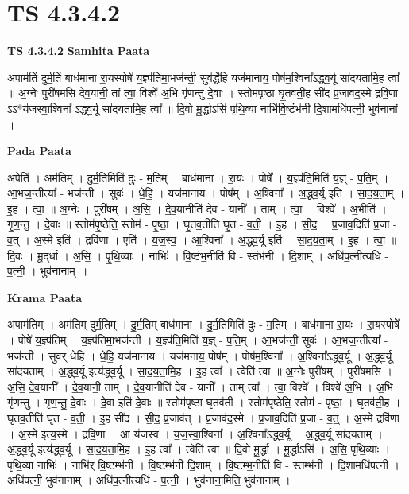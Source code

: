 \documentclass[17pt]{extarticle}
\begin{document}
\section{ TS 4.3.4.2 }

\textbf{TS 4.3.4.2 } \newline
\textbf{Samhita Paata} \newline

अपाम॑तिं दुर्म॒तिं बाध॑माना रा॒यस्पोषे॑ य॒ज्ञ्प॑तिमा॒भज॑न्ती॒ सुव॑र्द्धेहि॒ यज॑मानाय॒ पोष॑म॒श्विना᳚ऽद्ध्व॒र्यू सा॑दयतामि॒ह त्वा᳚ ॥ अ॒ग्नेः पुरी॑षमसि देव॒यानी॒ तां त्वा॒ विश्वे॑ अ॒भि गृ॑णन्तु दे॒वाः । स्तोम॑पृष्ठा घृ॒तव॑ती॒ह सी॑द प्र॒जाव॑द॒स्मे द्रवि॒णा ऽऽ*य॑जस्वा॒श्विना᳚ ऽद्ध्व॒र्यू सा॑दयतामि॒ह त्वा᳚ ॥ दि॒वो मू॒र्द्धाऽसि॑ पृथि॒व्या नाभि॑र्वि॒ष्टंभ॑नी दि॒शामधि॑पत्नी॒ भुव॑नानां । \newline

\textbf{Pada Paata} \newline

अपेति॑ । अम॑तिम् । दु॒र्म॒तिमिति॑ दुः - म॒तिम् । बाध॑माना । रा॒यः । पोषे᳚ । य॒ज्ञ्प॑ति॒मिति॑ य॒ज्ञ् - प॒ति॒म् । आ॒भज॒न्तीत्या᳚ - भज॑न्ती । सुवः॑ । धे॒हि॒ । यज॑मानाय । पोष᳚म् । अ॒श्विना᳚ । अ॒द्ध्व॒र्यू इति॑ । सा॒द॒य॒ता॒म् । इ॒ह । त्वा॒ ॥ अ॒ग्नेः । पुरी॑षम् । अ॒सि॒ । दे॒व॒यानीति॑ देव - यानी᳚ । ताम् । त्वा॒ । विश्वे᳚ । अ॒भीति॑ । गृ॒ण॒न्तु॒ । दे॒वाः ॥ स्तोम॑पृ॒ष्ठेति॒ स्तोम॑ - पृ॒ष्ठा॒ । घृ॒तव॒तीति॑ घृ॒त - व॒ती॒ । इ॒ह । सी॒द॒ । प्र॒जाव॒दिति॑ प्र॒जा - व॒त् । अ॒स्मे इति॑ । द्रवि॑णा । एति॑ । य॒ज॒स्व॒ । आ॒श्विना᳚ । अ॒द्ध्व॒र्यू इति॑ । सा॒द॒य॒ता॒म् । इ॒ह । त्वा॒ ॥ दि॒वः । मू॒द्‌र्धा । अ॒सि॒ । पृ॒थि॒व्याः । नाभिः॑ । वि॒ष्टंभ॒नीति॑ वि - स्तंभ॑नी । दि॒शाम् । अधि॑प॒त्नीत्यधि॑ - प॒त्नी॒ । भुव॑नानाम् ॥  \newline


\textbf{Krama Paata} \newline

अपाम॑तिम् । अम॑तिम् दुर्म॒तिम् । दु॒र्म॒तिम् बाध॑माना । दु॒र्म॒तिमिति॑ दुः - म॒तिम् । बाध॑माना रा॒यः । रा॒यस्पोषे᳚ । पोषे॑ य॒ज्ञ्प॑तिम् । य॒ज्ञ्प॑तिमा॒भज॑न्ती । य॒ज्ञ्प॑ति॒मिति॑ य॒ज्ञ् - प॒ति॒म् । आ॒भज॑न्ती॒ सुवः॑ । आ॒भज॒न्तीत्या᳚ - भज॑न्ती । सुव॑र् धेहि । धे॒हि॒ यज॑मानाय । यज॑मनाय॒ पोष᳚म् । पोष॑म॒श्विना᳚ । अ॒श्विना᳚ऽद्ध्व॒र्यू । अ॒द्ध्व॒र्यू सा॑दयताम् । अ॒द्ध्व॒र्यू इत्य॑द्ध्व॒र्यू । सा॒द॒य॒ता॒मि॒ह । इ॒ह त्वा᳚ । त्वेति॑ त्वा ॥ अ॒ग्नेः पुरी॑षम् । पुरी॑षमसि । अ॒सि॒ दे॒व॒यानी᳚ । दे॒व॒यानी॒ ताम् । दे॒व॒यानीति॑ देव - यानी᳚ । ताम् त्वा᳚ । त्वा॒ विश्वे᳚ । विश्वे॑ अ॒भि । अ॒भि गृ॑णन्तु । गृ॒ण॒न्तु॒ दे॒वाः । दे॒वा इति॑ दे॒वाः ॥ स्तोम॑पृष्ठा घृ॒तव॑ती । स्तोम॑पृ॒ष्ठेति॒ स्तोम॑ - पृ॒ष्ठा॒ । घृ॒तव॑ती॒ह । घृ॒तव॒तीति॑ घृ॒त - व॒ती॒ । इ॒ह सी॑द । सी॒द॒ प्र॒जाव॑त् । प्र॒जाव॑द॒स्मे । प्र॒जाव॒दिति॑ प्र॒जा - व॒त्॒ । अ॒स्मे द्रवि॑णा । अ॒स्मे इत्य॒स्मे । द्रवि॒णा । आ य॑जस्व । य॒ज॒स्वा॒श्विना᳚ । अ॒श्विना᳚ऽद्ध्व॒र्यू । अ॒द्ध्व॒र्यू सा॑दयताम् । अ॒द्ध्व॒र्यू इत्य॑द्ध्व॒र्यू । सा॒द॒य॒ता॒मि॒ह । इ॒ह त्वा᳚ । त्वेति॑ त्वा ॥ दि॒वो मू॒र्द्धा । मू॒र्द्धाऽसि॑ । अ॒सि॒ पृ॒थि॒व्याः । पृ॒थि॒व्या नाभिः॑ । नाभि॑र् वि॒ष्टम्भ॑नी । वि॒ष्टम्भ॑नी दि॒शाम् । वि॒ष्टम्भ॒नीति॑ वि - स्तम्भ॑नी । दि॒शामधि॑पत्नी । अधि॑पत्नी॒ भुव॑नानाम् । अधि॑प॒त्नीत्यधि॑ - प॒त्नी॒ । भुव॑नाना॒मिति॒ भुव॑नानाम् । \newline
\end{document}
